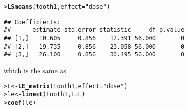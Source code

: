 \documentclass[11pt]{article}\usepackage[]{graphicx}\usepackage[]{color}
\makeatletter
\newcommand{\hlstr}[1]{\textcolor[rgb]{0.192,0.494,0.8}{#1}}%
\newcommand{\hlstd}[1]{\textcolor[rgb]{0.345,0.345,0.345}{#1}}%
\newcommand{\hlkwb}[1]{\textcolor[rgb]{0.69,0.353,0.396}{#1}}%
\newcommand{\hlkwc}[1]{\textcolor[rgb]{0.333,0.667,0.333}{#1}}%
\newcommand{\hlkwd}[1]{\textcolor[rgb]{0.737,0.353,0.396}{\textbf{#1}}}%
\newenvironment{kframe}{%
 \def\at@end@of@kframe{}%
 \ifinner\ifhmode%
  \def\at@end@of@kframe{\end{minipage}}%
  \begin{minipage}{\columnwidth}%
 \fi\fi%
 \def\FrameCommand##1{\hskip\@totalleftmargin \hskip-\fboxsep
 \colorbox{shadecolor}{##1}\hskip-\fboxsep
     \hskip-\linewidth \hskip-\@totalleftmargin \hskip\columnwidth}%
 \MakeFramed {\advance\hsize-\width
   \@totalleftmargin\z@ \linewidth\hsize
   \@setminipage}}%
 {\par\unskip\endMakeFramed%
 \at@end@of@kframe}
\newenvironment{knitrout}{}{} %
\renewenvironment{knitrout}{
  \begin{oldknitrout}
    \footnotesize
    \topsep=0pt
}{
  \end{oldknitrout}
}
\makeatother
\begin{document}
\begin{knitrout}
\color{fgcolor}\begin{kframe}
\begin{alltt}
\hlstd{> }\hlkwd{LSmeans}\hlstd{(tooth1,} \hlkwc{effect}\hlstd{=}\hlstr{"dose"}\hlstd{)}
\end{alltt}
\begin{verbatim}
## Coefficients:
##      estimate std.error statistic     df p.value
## [1,]   10.605     0.856    12.391 56.000       0
## [2,]   19.735     0.856    23.058 56.000       0
## [3,]   26.100     0.856    30.495 56.000       0
\end{verbatim}
\end{kframe}
\end{knitrout}




which is the same as

\begin{knitrout}
\color{fgcolor}\begin{kframe}
\begin{alltt}
\hlstd{> }\hlstd{L} \hlkwb{<-} \hlkwd{LE_matrix}\hlstd{(tooth1,} \hlkwc{effect}\hlstd{=}\hlstr{"dose"}\hlstd{)}
\hlstd{> }\hlstd{le} \hlkwb{<-} \hlkwd{linest}\hlstd{(tooth1,} \hlkwc{L}\hlstd{=L)}
\hlstd{> }\hlkwd{coef}\hlstd{(le)}
\end{alltt}
\end{kframe}
\end{knitrout}

\end{document}
